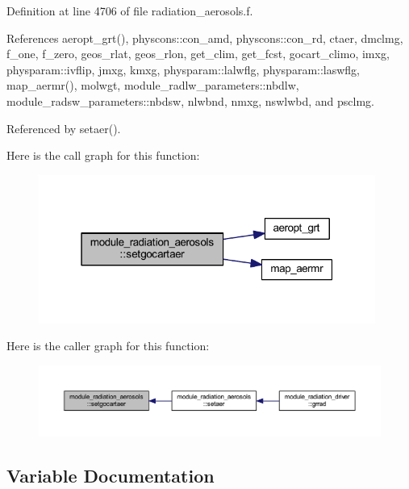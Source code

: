 Definition at line 4706 of file radiation\+\_\+aerosols.\+f.



References aeropt\+\_\+grt(), physcons\+::con\+\_\+amd, physcons\+::con\+\_\+rd, ctaer, dmclmg, f\+\_\+one, f\+\_\+zero, geos\+\_\+rlat, geos\+\_\+rlon, get\+\_\+clim, get\+\_\+fcst, gocart\+\_\+climo, imxg, physparam\+::ivflip, jmxg, kmxg, physparam\+::lalwflg, physparam\+::laswflg, map\+\_\+aermr(), molwgt, module\+\_\+radlw\+\_\+parameters\+::nbdlw, module\+\_\+radsw\+\_\+parameters\+::nbdsw, nlwbnd, nmxg, nswlwbd, and psclmg.



Referenced by setaer().



Here is the call graph for this function\+:
\nopagebreak
\begin{figure}[H]
\begin{center}
\leavevmode
\includegraphics[width=313pt]{namespacemodule__radiation__aerosols_abb28d29c21a8905eda601bfe5bfb3df4_cgraph}
\end{center}
\end{figure}




Here is the caller graph for this function\+:
\nopagebreak
\begin{figure}[H]
\begin{center}
\leavevmode
\includegraphics[width=350pt]{namespacemodule__radiation__aerosols_abb28d29c21a8905eda601bfe5bfb3df4_icgraph}
\end{center}
\end{figure}




\subsection{Variable Documentation}
